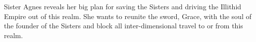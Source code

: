 Sister Agnes reveals her big plan for saving the Sisters and driving the Illithid Empire out of this realm.
She wants to reunite the sword, Grace, with the soul of the founder of the Sisters and block all inter-dimensional travel to or from this realm.
